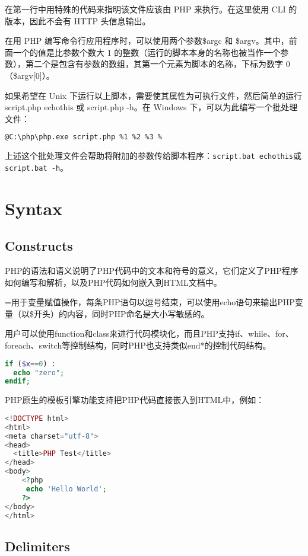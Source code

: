 在第一行中用特殊的代码来指明该文件应该由 PHP 来执行。在这里使用 CLI 的版本，因此不会有 HTTP 头信息输出。

在用 PHP 编写命令行应用程序时，可以使用两个参数\$argc 和 \$argv。其中，前面一个的值是比参数个数大 1 的整数（运行的脚本本身的名称也被当作一个参数），第二个是包含有参数的数组，其第一个元素为脚本的名称，下标为数字 0（\$argv[0]）。

如果希望在 Unix 下运行以上脚本，需要使其属性为可执行文件，然后简单的运行 script.php echothis 或 script.php -h。在 Windows 下，可以为此编写一个批处理文件：


\begin{lstlisting}[language=bash]
@C:\php\php.exe script.php %1 %2 %3 %
\end{lstlisting}

上述这个批处理文件会帮助将附加的参数传给脚本程序：\texttt{script.bat echothis}或\texttt{script.bat -h}。

\chapter{Syntax}


\section{Constructs}


PHP的语法和语义说明了PHP代码中的文本和符号的意义，它们定义了PHP程序如何编写和解析，以及PHP代码如何嵌入到HTML文档中。

=用于变量赋值操作，每条PHP语句以逗号结束，可以使用echo语句来输出PHP变量（以\$开头）的内容，同时PHP命名是大小写敏感的。

用户可以使用function和class来进行代码模块化，而且PHP支持if、while、for、foreach、switch等控制结构，同时PHP也支持类似end*的控制代码结构。

\begin{lstlisting}[language=PHP]
if ($x==0) : 
  echo "zero"; 
endif;
\end{lstlisting}


PHP原生的模板引擎功能支持把PHP代码直接嵌入到HTML中，例如：

\begin{lstlisting}[language=PHP]
<!DOCTYPE html>
<html>
<meta charset="utf-8">
<head>
  <title>PHP Test</title>
</head>
<body>
	<?php
	 echo 'Hello World';
	?>
</body>
</html>
\end{lstlisting}


\section{Delimiters}


